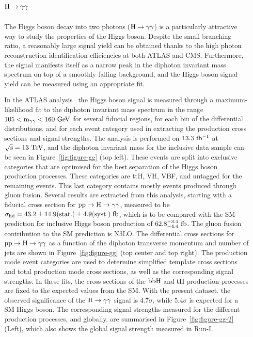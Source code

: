 \documentclass[10pt]{article}
\begin{document}
\section{\boldmath ${\rm H}\to\gamma\gamma$}

The Higgs boson decay into two photons (${\rm H\to\gamma\gamma}$) is a
particularly attractive way to study the properties of the Higgs boson. Despite
the small branching ratio, a reasonably large signal yield can be obtained thanks
to the high photon reconstruction identification efficiencies at both ATLAS and
CMS. Furthermore, the signal manifests itself as a narrow peak in the diphoton
invariant mass spectrum on top of a smoothly falling background, and the Higgs
boson signal yield can be measured using an appropriate fit.

In the ATLAS analysis~\cite{ATLAS-gg} the Higgs boson signal is measured through a
maximum-likelihood fit to the diphoton invariant mass spectrum in the range
${\rm 105 < m_{\gamma\gamma} < 160~GeV}$ for several fiducial regions, for
each bin of the differential distributions, and for each event category used
in extracting the production cross sections and signal strengths. The analysis
is performed on ${\rm 13.3~fb^{-1}}$ at ${\rm \sqrt{s} = 13~TeV}$, and the
diphoton invariant mass for the inclusive data sample can be seen in
Figure~\ref{fig:figure-gg} (top left). These events are split into exclusive
categories that are optimised for the best separation of the Higgs boson
production processes. These categories are ttH, VH, VBF, and untagged for the
remaining events. This last category contains mostly events produced through
gluon fusion. Several results are extracted from this analysis, starting with
a fiducial cross section for ${\rm pp\to H\to \gamma\gamma}$, measured to be
${\rm \sigma_{fid} = 43.2 \pm 14.9(stat.) \pm 4.9(syst.)~fb}$, which is to be
compared with the SM prediction for inclusive Higgs boson production of
${\rm 62.8_{-4.4}^{+3.4}~fb}$. The gluon fusion contribution to the SM
prediction is N3LO. The differential cross sections for ${\rm pp\to H\to \gamma\gamma}$
as a function of the diphoton transverse momentum and number of jets are shown
in Figure~\ref{fig:figure-gg} (top center and top right). The production mode
event categories are used to determine simplified template cross sections and
total production mode cross sections, as well as the corresponding signal
strengths. In these fits, the cross sections of the ${\rm bbH}$ and tH
production processes are fixed to the expected values from the SM. With the
present dataset, the observed significance of the ${\rm H\to\gamma\gamma}$ signal
is $4.7\sigma$, while $5.4\sigma$ is expected for a SM Higgs boson. The corresponding
signal strengths measured for the different production processes, and globally,
are summarised in Figure~\ref{fig:figure-gg-2} (Left), which also shows the global
signal strength measured in Run-I.
\end{document}
